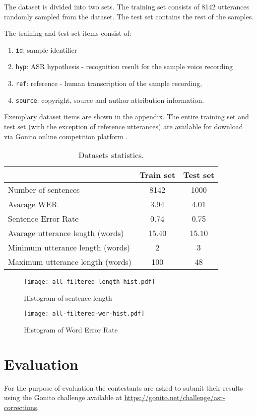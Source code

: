 \documentclass[10pt, a4paper]{article}
\begin{document}
The dataset is divided into two sets. 
The training set consists of 8142 utterances randomly sampled from the dataset.
The test set contains the rest of the samples.

The training and test set items consist of:
\begin{enumerate}
  \item \verb|id|: sample identifier
  \item \verb|hyp|: ASR hypothesis - recognition result for the sample voice recording
  \item \verb|ref|: reference - human transcription of the sample recording,
  \item \verb|source|: copyright, source and author attribution information.
\end{enumerate}
%
Exemplary dataset items are shown in the appendix.
The entire training set and test set (with the exception of reference utterances) are available for
download via Gonito online competition platform \cite{gonito}.


\begin{table}
\begin{tabular}{|l|c|c|}
\hline 
  & Train set & Test set \\ 
\hline 
Number of sentences & 8142 & 1000 \\ 
\hline 
Avarage WER & 3.94 & 4.01 \\ 
\hline 
Sentence Error Rate & 0.74 & 0.75 \\ 
\hline 
Avarage utterance length (words) & 15.40 & 15.10  \\ 
\hline 
Minimum utterance length (words) & 2 & 3 \\ 
\hline 
Maximum utterance length (words) & 100 & 48  \\ 
\hline 
\end{tabular}
\caption{Datasets statistics.}
\end{table}

\begin{figure}[htbp]
  \centering
    \texttt{[image: all-filtered-length-hist.pdf]}
  \caption{Histogram of sentence length}
\end{figure}


\begin{figure}[htbp]
  \centering
    \texttt{[image: all-filtered-wer-hist.pdf]}
  \caption{Histogram of Word Error Rate}
\end{figure}


\section{Evaluation}
For the purpose of evaluation the contestants are asked to submit 
their results using the Gonito \cite{gonito} challenge available at \url{https://gonito.net/challenge/asr-corrections}.
\end{document}
